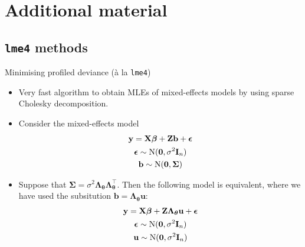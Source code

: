 \documentclass[]{beamer}\usepackage[]{graphicx}\usepackage[]{color}
\newcommand{\N}{\text{\normalfont N}}
\begin{document}
\section{Additional material}

\subsection[lme4 methods]{\texttt{lme4} methods}

\begin{frame}{Minimising profiled deviance (à la \texttt{lme4})}
	\begin{itemize}
		\item Very fast algorithm to obtain MLEs of mixed-effects models by using sparse Cholesky decomposition.
		\item Consider the mixed-effects model
		\begin{align*}
			\begin{gathered}
				\mathbf y = \mathbf X\boldsymbol{\beta} + \mathbf Z\mathbf b + \boldsymbol{\epsilon} \\
				\boldsymbol{\epsilon} \sim \N (\mathbf 0, \sigma^2 \mathbf I_n) \\
				\mathbf b \sim \N (\mathbf 0, \boldsymbol{\Sigma})
			\end{gathered}
		\end{align*}
		\item Suppose that $\boldsymbol{\Sigma} = \sigma^2\boldsymbol{\Lambda}_{\boldsymbol{\theta}}\boldsymbol{\Lambda}_{\boldsymbol{\theta}}^\top$. Then the following model is equivalent, where we have used the subsitution $\mathbf b = \boldsymbol{\Lambda}_{\boldsymbol{\theta}}\mathbf u$:
		\begin{align*}
			\begin{gathered}
				\mathbf y = \mathbf X\boldsymbol{\beta} + \mathbf Z\boldsymbol{\Lambda}_{\boldsymbol{\theta}}\mathbf u + \boldsymbol{\epsilon} \\
				\boldsymbol{\epsilon} \sim \N (\mathbf 0, \sigma^2 \mathbf I_n) \\
				\mathbf u \sim \N (\mathbf 0, \sigma^2 \mathbf I_n)
			\end{gathered}
		\end{align*}
	\end{itemize}
\end{frame}
\end{document}
